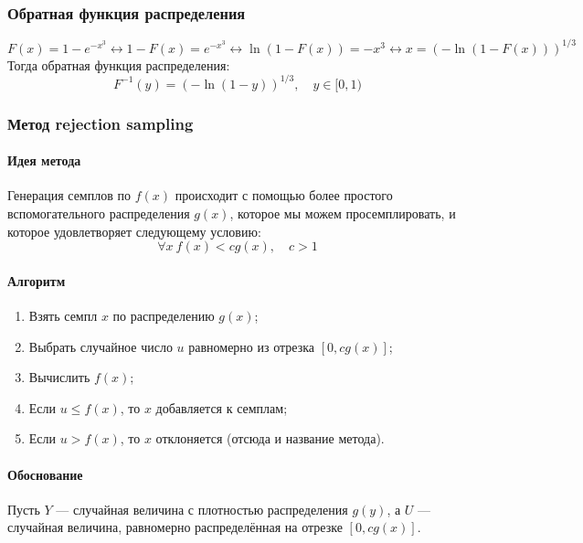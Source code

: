 \documentclass[a4paper,14pt]{extarticle}
\begin{document}
            \subsubsection*{Обратная функция распределения}
                \[
                    F(x) = 1 - e^{-x^3} \leftrightarrow
                    1 - F(x) = e^{-x^3} \leftrightarrow
                    \ln(1 - F(x)) = -x^3 \leftrightarrow
                    x = (-\ln(1 - F(x)))^{1/3}
                \]
                Тогда обратная функция распределения:
                \[
                    F^{-1}(y) = (-\ln(1 - y))^{1/3}, \quad y \in [0, 1)
                \]
            
            \subsubsection*{Метод rejection sampling}
                
                \paragraph{Идея метода}
                    Генерация семплов по $f(x)$ происходит с помощью более простого вспомогательного распределения $g(x)$, которое мы можем просемплировать, и которое удовлетворяет следующему условию:
                    \[
                    \forall x \ f(x)<cg(x), \quad c > 1
                    \]
                
                \paragraph{Алгоритм}
                    \begin{enumerate}
                            \item Взять семпл $x$ по распределению $g(x)$;
                            \item Выбрать случайное число $u$ равномерно из отрезка $[0,cg(x)]$;
                            \item Вычислить $f(x)$;
                            \item Если $u \leq f(x)$, то $x$ добавляется к семплам;
                            \item Если $u > f(x)$, то $x$ отклоняется (отсюда и название метода).
                    \end{enumerate}
                
                \paragraph{Обоснование}
                    Пусть $Y$ — случайная величина с плотностью распределения $g(y)$, а $U$ — случайная величина, равномерно распределённая на отрезке $[0, cg(x)]$.
                    
\end{document}
